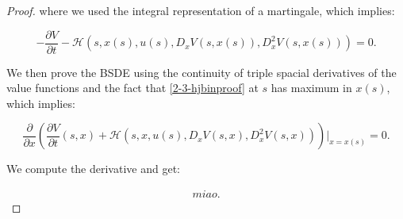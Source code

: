 \begin{theorem}
\begin{proof}
        where we used the integral representation of a martingale, which implies:

        \begin{equation}\label{2-3-hjbinproof}
            -\frac{\partial V}{\partial t} - \mathcal{H}(s,x(s),u(s),D_xV(s,x(s)),D_x^2V(s,x(s))) = 0.
        \end{equation}

        We then prove the BSDE using the continuity of triple spacial derivatives of the value functions and 
        the fact that \ref{2-3-hjbinproof} at $s$ has maximum in $x(s)$, which implies:

        \[\frac{\partial}{\partial x}\left(\frac{\partial V}{\partial t}(s,x) + \mathcal{H}(s,x,u(s),D_xV(s,x),D_x^2V(s,x))\right)\big|_{x=x(s)}=0.\]

        We compute the derivative and get:

        \begin{align}
            miao.
        \end{align}
    \end{proof}
\end{theorem}